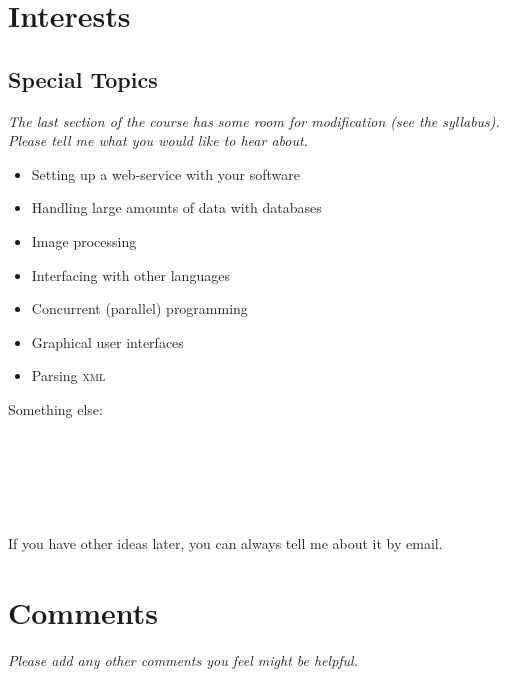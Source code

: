 \documentclass[article,twoside]{memoir}
\newcommand*{\fillunderscore}{~\hrulefill}
\newcommand*{\checkbox}{$\square$}
\newcommand{\header}[1]{\textsl{#1}\par\medskip}
\begin{document}
\chapter{Interests}

\section{Special Topics}

\header{The last section of the course has some room for modification (see the syllabus). Please tell me what you would like to hear about.}

\begin{itemize}[\checkbox]
\item Setting up a web-service with your software
\item Handling large amounts of data with databases
\item Image processing
\item Interfacing with other languages
\item Concurrent (parallel) programming
\item Graphical user interfaces
\item Parsing \textsc{xml}
\end{itemize}

Something else: \fillunderscore\par
\fillunderscore\par
\fillunderscore\par
\fillunderscore

If you have other ideas later, you can always tell me about it by email.

\chapter{Comments}

\header{Please add any other comments you feel might be helpful.}

\fillunderscore\par
\fillunderscore\par
\fillunderscore\par
\fillunderscore\par
\fillunderscore\par
\fillunderscore\par
\fillunderscore\par
\fillunderscore\par
\fillunderscore
\end{document}
